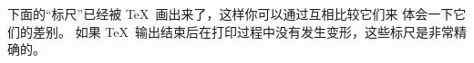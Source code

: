 \smallskip
下面的``标尺''已经被 \TeX\ 画出来了，这样你可以通过互相比较它们来%
体会一下它们的差\hbox{别。}%
如果 \TeX\ 输出结束后在打印过程中没有发生变形，这些标尺是非常精确的。%
